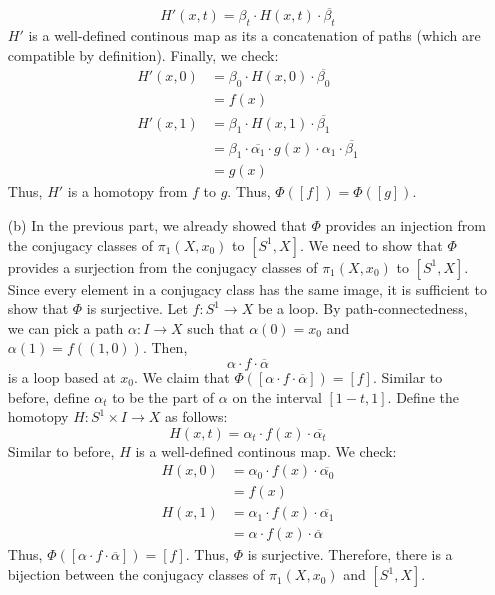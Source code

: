 \documentclass[12pt]{article}
\begin{document}
\begin{solu}
\begin{itemize}
        \[H'(x, t) = \beta_t \cdot H(x, t) \cdot \overline{\beta_t }\]
        $H'$ is a well-defined continous map as its a concatenation of paths (which are compatible by definition). Finally, we check: 
        \begin{align*}
            H'(x, 0) &= \beta_0 \cdot H(x, 0) \cdot \overline{\beta_0} \\
            &= f(x) \\
            H'(x, 1) &= \beta_1 \cdot H(x, 1) \cdot \overline{\beta_1} \\
            &= \beta_1 \cdot \overline{\alpha_1 } \cdot g(x) \cdot \alpha_1 \cdot \overline{\beta_1}\\
            &= g(x)
        \end{align*}
        Thus, $H'$ is a homotopy from $f$ to $g$. Thus, $\Phi([f]) = \Phi([g])$.
        \item[(b)] In the previous part, we already showed that $\Phi$ provides an injection from the conjugacy classes of $\pi_1(X, x_0)$ to $[S^1, X]$. We need to show that $\Phi$ provides a surjection from the conjugacy classes of $\pi_1(X, x_0)$ to $[S^1, X]$. Since every element in a conjugacy class has the same image, it is sufficient to show that $\Phi$ is surjective. \bbni
        Let $f: S^1 \to X$ be a loop. By path-connectedness, we can pick a path $\alpha: I \to X$ such that $\alpha(0) = x_0$ and $\alpha(1) = f((1,0))$. Then, 
        \[\alpha \cdot f \cdot \overline{\alpha} \]
        is a loop based at $x_0$. We claim that $\Phi([\alpha \cdot f \cdot \overline{\alpha}]) = [f]$. Similar to before, define $\alpha_t$ to be the part of $\alpha$ on the interval $[1-t, 1]$. Define the homotopy $H: S^1 \times I \to X$ as follows:
        \[ H(x, t) = \alpha_t \cdot f(x) \cdot \overline{\alpha_t} \]
        Similar to before, $H$ is a well-defined continous map. We check: 
        \begin{align*}
            H(x, 0) &= \alpha_0 \cdot f(x) \cdot \overline{\alpha_0} \\
            &= f(x) \\
            H(x, 1) &= \alpha_1 \cdot f(x) \cdot \overline{\alpha_1} \\
            &= \alpha \cdot f(x) \cdot \overline{\alpha}
        \end{align*}
        Thus, $\Phi([\alpha \cdot f \cdot \overline{\alpha}]) = [f]$. Thus, $\Phi$ is surjective. Therefore, there is a bijection between the conjugacy classes of $\pi_1(X, x_0)$ and $[S^1, X]$.
    \end{itemize}
\end{solu}
\newpage
\end{document}
